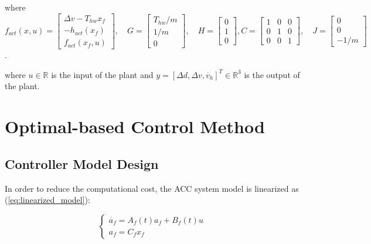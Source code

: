 \documentclass{article}
\numberwithin{equation}{section}
\begin{document}
\noindent where
$f_{a c t}(x,u)=\left[\begin{array}{c}
            \Delta v-T_{h w} x_{f}       \\
            -h_{a c t}\left(x_{f}\right) \\
            f_{a c t}\left(x_{f}, u\right)
        \end{array}\right], \quad G=\left[\begin{array}{c}
            T_{h w} / m \\
            1 / m       \\
            0
        \end{array}\right], \quad H=\left[\begin{array}{l}
            0 \\
            1 \\
            0
        \end{array}\right],C=\left[\begin{array}{lll}
            1 & 0 & 0 \\
            0 & 1 & 0 \\
            0 & 0 & 1
        \end{array}\right], \quad J=\left[\begin{array}{c}
            0 \\
            0 \\
            -1 / m
        \end{array}\right]$.

\noindent where $u \in \mathbb{R}$ is the input of the plant and
$y = [\Delta d, \Delta v, \dot{v_h}]^T \in \mathbb{R}^{3}$ is the output of the plant.

\section{Optimal-based Control Method}

\subsection{Controller Model Design}
In order to reduce the computational cost, the ACC system model is linearized
as (\ref{eq:linearized_model}):

\begin{equation}
    \left\{\begin{array}{l}\label{eq:linearized_model}
        \dot{a_f}=A_f(t)a_f+B_f(t)u \\
        a_f=C_fx_f
    \end{array}\right.
\end{equation}
\end{document}
